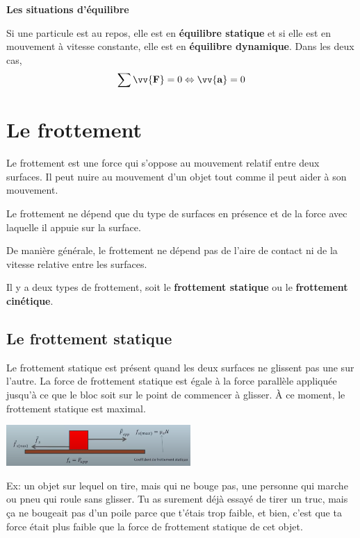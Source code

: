 \documentclass{article}
\begin{document}
\noindent
\textbf{Les situations d'équilibre}
\newline

Si une particule est au repos, elle est en \textbf{équilibre statique} et si elle est en mouvement à vitesse constante, elle est en \textbf{équilibre dynamique}. Dans les deux cas,
\[\sum \vv{\mathbf{F}} = 0 \Leftrightarrow \vv{\mathbf{a}} = 0\]


\section{Le frottement}
Le frottement est une force qui s'oppose au mouvement relatif entre deux surfaces. Il peut nuire au mouvement d'un objet tout comme il peut aider à son mouvement.
\newline

Le frottement ne dépend que du type de surfaces en présence et de la force avec laquelle il appuie sur la surface.
\newline

De manière générale, le frottement ne dépend pas de l'aire de contact ni de la vitesse relative entre les surfaces.
\newline

Il y a deux types de frottement, soit le \textbf{frottement statique} ou le \textbf{frottement cinétique}.

\subsection{Le frottement statique}
Le frottement statique est présent quand les deux surfaces ne glissent pas une sur l'autre.
\newline
La force de frottement statique est égale à la force parallèle appliquée jusqu'à ce que le bloc soit sur le point de commencer à glisser. À ce moment, le frottement statique est maximal.
\newline

\includegraphics[width=7cm]{Image/frottementStatique.png}
\newline

Ex: un objet sur lequel on tire, mais qui ne bouge pas, une personne qui marche ou pneu qui roule sans glisser.
Tu as surement déjà essayé de tirer un truc, mais ça ne bougeait pas d'un poile parce que t'étais trop faible, et bien, c'est que ta force était plus faible que la force de frottement statique de cet objet.
\newline
\end{document}
